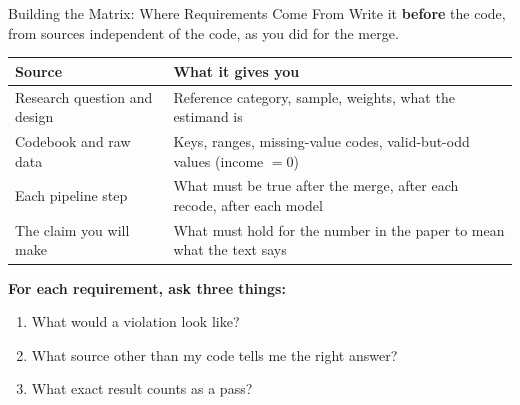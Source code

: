 \documentclass[aspectratio=169, 11pt]{beamer}
\begin{document}
\begin{frame}{Building the Matrix: Where Requirements Come From}
  Write it \textbf{before} the code, from sources independent of the code, as you did for the merge.

  \vspace{0.4em}
  \small
  \renewcommand{\arraystretch}{1.1}
  \begin{tabular}{@{}L{0.26\textwidth}L{0.62\textwidth}@{}}
    \toprule
    \textbf{Source} & \textbf{What it gives you} \\
    \midrule
    Research question and design & Reference category, sample, weights, what the estimand is \\
    Codebook and raw data & Keys, ranges, missing-value codes, valid-but-odd values (income $=0$) \\
    Each pipeline step & What must be true after the merge, after each recode, after each model \\
    The claim you will make & What must hold for the number in the paper to mean what the text says \\
    \bottomrule
  \end{tabular}

  \vspace{0.3em}
  \textbf{For each requirement, ask three things:}
  \begin{enumerate}
    \item What would a violation look like?
    \item What source other than my code tells me the right answer?
    \item What exact result counts as a pass?
  \end{enumerate}
\end{frame}
\end{document}
